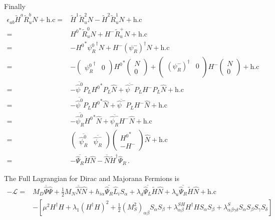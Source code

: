 Finally
\begin{align}
\label{eq:HRuN}
  \epsilon_{ab}\widetilde{H}^a \widetilde{R}_u^b N+\text{h.c}=&\widetilde{H}^1 \widetilde{R}_u^2 N-\widetilde{H}^2 \widetilde{R}_u^1 N +\text{h.c}\nonumber\\
=&{H^0}^* \widetilde{R}_u^0 N+{H}^-\widetilde{R}_u^+ N +\text{h.c}\nonumber\\
=&-{H^0}^* {\psi_R^0}^{\dagger} N+{H}^- \left( \psi_R^- \right)^{\dagger} N +\text{h.c}\nonumber\\
  =&-\begin{pmatrix}
{\psi_R^0}^{\dagger} & 0    
  \end{pmatrix}{H^0}^*
  \begin{pmatrix}
N\\
0    
  \end{pmatrix}
 +\begin{pmatrix}
\left( \psi_R^- \right)^{\dagger} & 0\\   
 \end{pmatrix}{H}^-
 \begin{pmatrix}
   N\\
   0
 \end{pmatrix}
 +\text{h.c}\nonumber\\
  =&-\overline{\widehat{\psi}^0}P_L{H^0}^* P_L \widehat{N} +
 \overline{\widehat{\psi}^-}P_L{H}^-P_L\widehat{N} +\text{h.c}\nonumber\\
  =&-\overline{\widehat{\psi}^0}P_L{H^0}^* \widehat{N} +
 \overline{\widehat{\psi}^-}P_L{H}^-\widehat{N} +\text{h.c}\nonumber\\
  =&-\overline{\widehat{\psi}^0_R}{H^0}^* \widehat{N} +
 \overline{\widehat{\psi}^-_{R}}{H}^-\widehat{N} +\text{h.c}\nonumber\\
  =&  \begin{pmatrix}
 \overline{\widehat{\psi}^0_R} &  \overline{\widehat{\psi}^-_{R}}
  \end{pmatrix}
  \begin{pmatrix}
{H^0}^*\\
-{H}^-    
  \end{pmatrix}
\widehat{N} +\text{h.c}\nonumber\\
=&-\overline{\widehat{\Psi}_{R}}\widetilde{H}\widehat{N} -\overline{\widehat{N}}\widetilde{H}^{\dagger}\widehat{\Psi}_R\,.
\end{align}


The Full Lagrangian for Dirac and Majorana Fermions is 
\begin{align}
\label{eq:lfull}
  -\mathcal{L}=&M_D \overline{\widehat{\Psi}}\widehat{\Psi}+\tfrac{1}{2}M_N\overline{\widehat{N}}\widehat{N}
+h_{i\alpha} \overline{\widehat{\Psi}_{R}} \widehat{L}_i S_{\alpha}
+\lambda_d\overline{\widehat{\Psi}_L}\widetilde{H} \widehat{N}
+\lambda_u\overline{\widehat{\Psi}_{R}}\widetilde{H}\widehat{N}+\text{h.c}\nonumber\\
&-\left[ \mu^2 H^{\dagger}H+\lambda_1 \left(H^{\dagger}H \right)^2+\tfrac{1}{2}\left(M_S^2\right)_{\alpha\beta} S_{\alpha}S_\beta
   +\lambda^{SH}_{\alpha\beta} H^{\dagger}H S_{\alpha}S_{\beta}+\lambda^{S}_{\alpha\beta\gamma\delta}S_{\alpha}S_{\beta}S_{\gamma}S_{\delta} \right]
\end{align}

